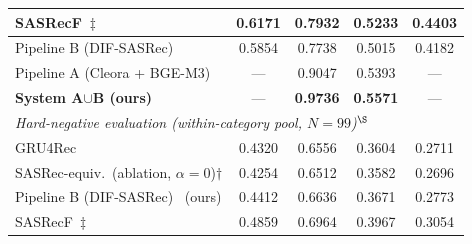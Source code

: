 \begin{table}[ht]
\begin{tabular}{lcccc}
SASRecF~\cite{kang2018self}$\ddagger$    & 0.6171 & 0.7932 & 0.5233 & 0.4403 \\
\hline
Pipeline B (DIF-SASRec)~\cite{xie2022difsasrec} & 0.5854 & 0.7738 & 0.5015 & 0.4182 \\
Pipeline A (Cleora + BGE-M3)            & ---      & 0.9047 & 0.5393 & ---      \\
\textbf{System A$\cup$B (ours)}         & ---      & \textbf{0.9736} & \textbf{0.5571} & --- \\
\hline
\multicolumn{5}{l}{\textit{Hard-negative evaluation (within-category pool, $N{=}99$)$^\S$}} \\
\hline
GRU4Rec~\cite{hidasi2016gru4rec}                          & 0.4320 & 0.6556 & 0.3604 & 0.2711 \\
SASRec-equiv.~(ablation, $\alpha{=}0$)$\dagger$           & 0.4254 & 0.6512 & 0.3582 & 0.2696 \\
Pipeline B (DIF-SASRec)~\cite{xie2022difsasrec} (ours) & 0.4412 & 0.6636 & 0.3671 & 0.2773 \\
SASRecF~\cite{kang2018self}$\ddagger$                     & 0.4859 & 0.6964 & 0.3967 & 0.3054 \\
\hline
\end{tabular}
\end{table}
